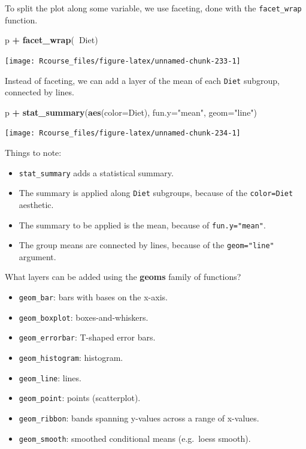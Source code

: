 \documentclass[]{book}
\newenvironment{Shaded}{\begin{snugshade}}{\end{snugshade}}
\newcommand{\KeywordTok}[1]{\textcolor[rgb]{0.13,0.29,0.53}{\textbf{#1}}}
\newcommand{\DataTypeTok}[1]{\textcolor[rgb]{0.13,0.29,0.53}{#1}}
\newcommand{\StringTok}[1]{\textcolor[rgb]{0.31,0.60,0.02}{#1}}
\newcommand{\OperatorTok}[1]{\textcolor[rgb]{0.81,0.36,0.00}{\textbf{#1}}}
\newcommand{\NormalTok}[1]{#1}
\providecommand{\tightlist}{%
  \setlength{\itemsep}{0pt}\setlength{\parskip}{0pt}}
\theoremstyle{definition}
\theoremstyle{definition}
\theoremstyle{definition}
\theoremstyle{remark}
\begin{document}
To split the plot along some variable, we use faceting, done with the
\texttt{facet\_wrap} function.

\begin{Shaded}
\begin{Highlighting}[]
\NormalTok{p }\OperatorTok{+}\StringTok{ }\KeywordTok{facet_wrap}\NormalTok{(}\OperatorTok{~}\NormalTok{Diet)}
\end{Highlighting}
\end{Shaded}

\texttt{[image: Rcourse\_files/figure-latex/unnamed-chunk-233-1]}

Instead of faceting, we can add a layer of the mean of each
\texttt{Diet} subgroup, connected by lines.

\begin{Shaded}
\begin{Highlighting}[]
\NormalTok{p }\OperatorTok{+}\StringTok{ }\KeywordTok{stat_summary}\NormalTok{(}\KeywordTok{aes}\NormalTok{(}\DataTypeTok{color=}\NormalTok{Diet), }\DataTypeTok{fun.y=}\StringTok{"mean"}\NormalTok{, }\DataTypeTok{geom=}\StringTok{"line"}\NormalTok{)}
\end{Highlighting}
\end{Shaded}

\texttt{[image: Rcourse\_files/figure-latex/unnamed-chunk-234-1]}

Things to note:

\begin{itemize}
\tightlist
\item
  \texttt{stat\_summary} adds a statistical summary.
\item
  The summary is applied along \texttt{Diet} subgroups, because of the
  \texttt{color=Diet} aesthetic.
\item
  The summary to be applied is the mean, because of
  \texttt{fun.y="mean"}.
\item
  The group means are connected by lines, because of the
  \texttt{geom="line"} argument.
\end{itemize}

What layers can be added using the \textbf{geoms} family of functions?

\begin{itemize}
\tightlist
\item
  \texttt{geom\_bar}: bars with bases on the x-axis.
\item
  \texttt{geom\_boxplot}: boxes-and-whiskers.
\item
  \texttt{geom\_errorbar}: T-shaped error bars.
\item
  \texttt{geom\_histogram}: histogram.
\item
  \texttt{geom\_line}: lines.
\item
  \texttt{geom\_point}: points (scatterplot).
\item
  \texttt{geom\_ribbon}: bands spanning y-values across a range of
  x-values.
\item
  \texttt{geom\_smooth}: smoothed conditional means (e.g.~loess smooth).
\end{itemize}
\end{document}
